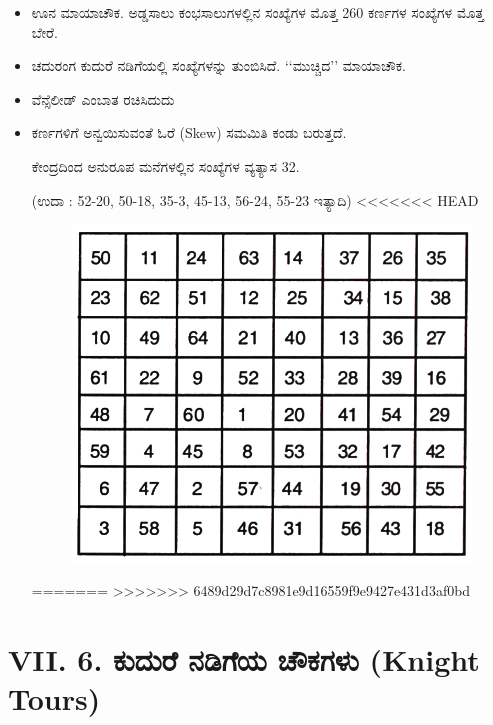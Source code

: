 \begin{itemize}
	\item ಊನ ಮಾಯಾಚೌಕ. ಅಡ್ಡಸಾಲು ಕಂಭಸಾಲುಗಳಲ್ಲಿನ ಸಂಖ್ಯೆಗಳ ಮೊತ್ತ 260 ಕರ್ಣಗಳ ಸಂಖ್ಯೆಗಳ ಮೊತ್ತ ಬೇರೆ.
	\item ಚದುರಂಗ ಕುದುರೆ ನಡಿಗೆಯಲ್ಲಿ ಸಂಖ್ಯೆಗಳನ್ನು ತುಂಬಿಸಿದೆ. ‘‘ಮುಚ್ಚಿದ’’ ಮಾಯಾಚೌಕ.
	\item ವೆನ್ಸೆಲೀಡ್ ಎಂಬಾತ ರಚಿಸಿದುದು
	\item ಕರ್ಣಗಳಿಗೆ ಅನ್ವಯಿಸುವಂತೆ ಓರೆ (Skew) ಸಮಮಿತಿ ಕಂಡು ಬರುತ್ತದೆ.

	ಕೇಂದ್ರದಿಂದ ಅನುರೂಪ ಮನೆಗಳಲ್ಲಿನ ಸಂಖ್ಯೆಗಳ ವ್ಯತ್ಯಾಸ 32.

	(ಉದಾ : 52-20, 50-18, 35-3, 45-13, 56-24, 55-23 ಇತ್ಯಾದಿ)
<<<<<<< HEAD
	\begin{figure}[H]
	\includegraphics{src/figures/chap6/fig6-7.jpg}
	\end{figure}
=======
>>>>>>> 6489d29d7c8981e9d16559f9e9427e431d3af0bd
\end{itemize}

\section*{VII. 6. ಕುದುರೆ ನಡಿಗೆಯ ಚೌಕಗಳು (Knight Tours)}

